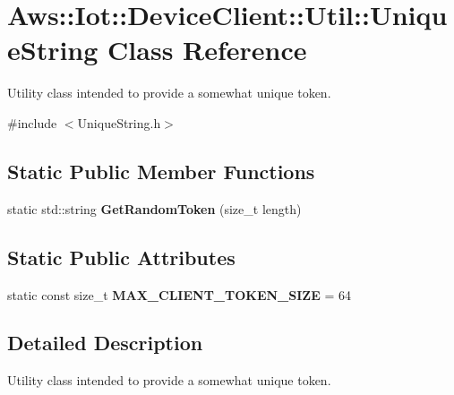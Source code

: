\hypertarget{class_aws_1_1_iot_1_1_device_client_1_1_util_1_1_unique_string}{}\section{Aws\+:\+:Iot\+:\+:Device\+Client\+:\+:Util\+:\+:Unique\+String Class Reference}
\label{class_aws_1_1_iot_1_1_device_client_1_1_util_1_1_unique_string}


Utility class intended to provide a somewhat \textquotesingle{}unique\textquotesingle{} token.  




{\ttfamily \#include $<$Unique\+String.\+h$>$}

\subsection*{Static Public Member Functions}
\begin{DoxyCompactItemize}
\item 
\mbox{\label{class_aws_1_1_iot_1_1_device_client_1_1_util_1_1_unique_string_a26db8c5f22628539193d1098d148d820}} 
static std\+::string {\bfseries Get\+Random\+Token} (size\+\_\+t length)
\end{DoxyCompactItemize}
\subsection*{Static Public Attributes}
\begin{DoxyCompactItemize}
\item 
\mbox{\label{class_aws_1_1_iot_1_1_device_client_1_1_util_1_1_unique_string_a256fd64d43db7050db5a43594682e931}} 
static const size\+\_\+t {\bfseries M\+A\+X\+\_\+\+C\+L\+I\+E\+N\+T\+\_\+\+T\+O\+K\+E\+N\+\_\+\+S\+I\+ZE} = 64
\end{DoxyCompactItemize}


\subsection{Detailed Description}
Utility class intended to provide a somewhat \textquotesingle{}unique\textquotesingle{} token. 

